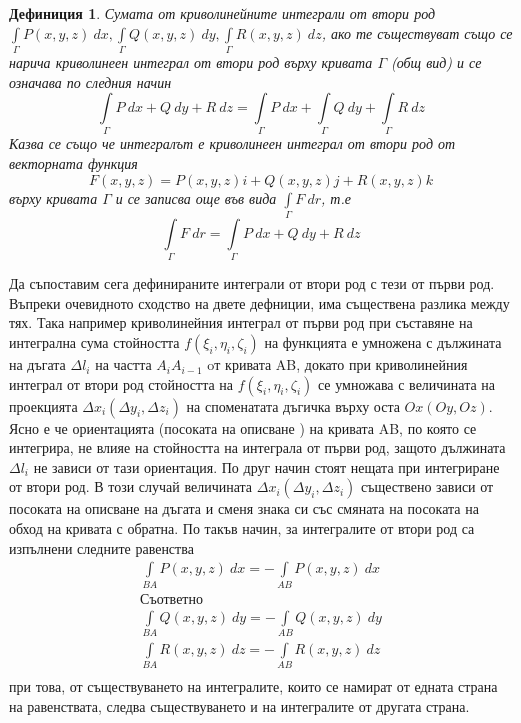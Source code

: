 \documentclass[a4paper,fleqn,12pt]{article}
\newtheorem{definition}{Дефиниция}[subsection]
\theoremstyle{definition}
\begin{document}
\begin{definition}
Сумата от криволинейните интеграли от втори род $\int\limits_{\Gamma} P(x,y,z) \ dx, \int\limits_{\Gamma} Q(x,y,z) \ dy, \int\limits_{\Gamma} R(x,y,z) \ dz$, ако те съществуват също се нарича криволинеен интеграл от втори род върху кривата $\Gamma$ (общ вид) и се означава по следния начин 
$$\int\limits_{\Gamma} P \ dx + Q \ dy + R \ dz = \int\limits_{\Gamma} P \ dx + \int\limits_{\Gamma} Q \ dy + \int\limits_{\Gamma} R \ dz$$
Казва се също че интегралът е криволинеен интеграл от втори род от векторната функция 
$$F(x,y,z) = P(x,y,z) i + Q(x,y,z) j + R(x,y,z) k$$
върху кривата $\Gamma$ и се записва още във вида $\int\limits_{\Gamma} F \ dr$, т.е
$$\int\limits_{\Gamma} F \ dr = \int\limits_{\Gamma} P \ dx + Q \ dy + R \ dz $$
\end{definition}
Да съпоставим сега дефинираните интеграли от втори род с тези от първи род. 
Въпреки очевидното сходство на двете дефниции, има съществена разлика между тях. 
Така например криволинейния интеграл от първи род при съставяне на интегрална сума стойността $f(\xi_i,\eta_i,\zeta_i)$ на функцията е умножена с дължината на дъгата $\Delta l_i$ на частта $A_i A_{i-1}$ oт кривата AB, докато при криволинейния интеграл от втори род стойността на $f(\xi_i,\eta_i,\zeta_i)$ се умножава с величината на проекцията $\Delta x_i(\Delta y_i, \Delta z_i)$ на споменатата дъгичка върху оста $Ox(Oy, Oz)$. \\
Ясно е че ориентацията (посоката на описване ) на кривата AB, по която се интегрира, не влияе на стойността на интеграла от първи род, защото дължината $\Delta l_i$ не зависи от тази ориентация.
По друг начин стоят нещата при интегриране от втори род.
В този случай величината $\Delta x_i(\Delta y_i, \Delta z_i)$ съществено зависи от посоката на описване на дъгата и сменя знака си със смяната на посоката на обход на кривата с обратна. 
По такъв начин, за интегралите от втори род са изпълнени следните равенства 
\begin{gather*}
\int\limits_{BA} P(x,y,z) \ dx = - \int\limits_{AB} P(x,y,z) \ dx\\
\text{Съответно} \\
\int\limits_{BA} Q(x,y,z) \ dy = - \int\limits_{AB} Q(x,y,z) \ dy\\
\int\limits_{BA} R(x,y,z) \ dz = - \int\limits_{AB} R(x,y,z) \ dz\\
\end{gather*}
при това, от съществуването на интегралите, които се намират от едната страна на равенствата, следва съществуването и на интегралите от другата страна. 
\end{document}
